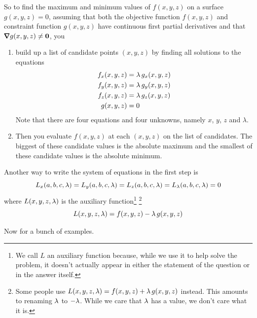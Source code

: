 So to find the maximum and minimum values of $f(x,y,z)$ on a surface 
$g(x,y,z)=0$, assuming that both the objective function $f(x,y,z)$ 
and constraint function $g(x,y,z)$ have continuous first partial 
derivatives and that $\vnabla g(x,y,z)\ne\vZero$, you
\begin{enumerate}
\item build up a list of candidate points $(x,y,z)$ by finding all 
solutions to the equations
\begin{align*}
f_x(x,y,z) &= \lambda\, g_x(x,y,z)\\
f_y(x,y,z) &= \lambda\, g_y(x,y,z)\\
f_z(x,y,z) &= \lambda\, g_z(x,y,z)\\
g(x,y,z)&=0
\end{align*}
Note that there are four equations and four unknowns, namely $x$, $y$, $z$
and $\lambda$.
\item Then you evaluate $f(x,y,z)$ at each $(x,y,z)$ on the list 
of candidates.
   The biggest of these candidate values is the absolute maximum 
   and the smallest of these candidate values is the absolute minimum.
\end{enumerate}
Another way to write the system of equations in the first step is
\begin{equation*}
L_x(a,b,c,\lambda) = L_y(a,b,c,\lambda) = L_z(a,b,c,\lambda) = L_\lambda(a,b,c,\lambda) = 0
\end{equation*}
where $L(x,y,z,\lambda)$ is the auxiliary function\footnote{We call $L$ an auxiliary function because, while we use it to help solve the problem,
it doesn't actually appear in either the statement of the question or in 
the answer itself.} \footnote{Some people
use $L(x,y,z,\lambda)=f(x,y,z)+\lambda\, g(x,y,z)$ instead. This amounts to renaming
$\lambda$ to $-\lambda$. While we care that $\lambda$ has a value, we don't care what it 
is.}
\begin{equation*}
L(x,y,z,\lambda)=f(x,y,z)-\lambda\, g(x,y,z)
\end{equation*}

Now for a bunch of examples.

